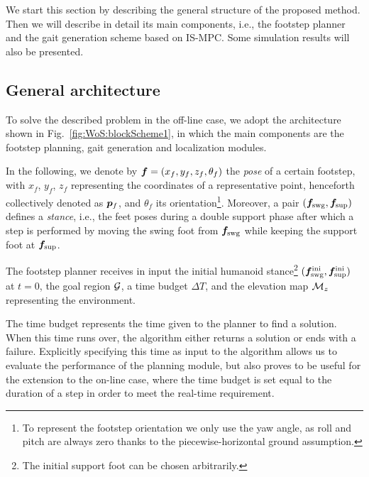 We start this section by describing the general structure of the proposed method. Then we will describe in detail its main components, i.e., the footstep planner and the gait generation scheme based on IS-MPC. Some simulation results will also be presented.   

\subsection{General architecture}
\label{sec:WoS:offlineCase:GeneralArchitecture}

To solve the described problem in the off-line case, we adopt the architecture shown in Fig.~\ref{fig:WoS:blockScheme1}, in which the main components are the footstep planning, gait generation and localization modules.

In the following, we denote by ${\bm{f}} = (x_{f}, y_{f}, z_{f}, \theta_{f})$ the {\em pose} of a certain footstep, with $x_{f}$, $y_{f}$, $z_{f}$ representing the coordinates of a representative point, henceforth collectively denoted as ${\bm{p}}_f$, and $\theta_{f}$ its orientation\footnote{To represent the footstep orientation we only use the yaw angle, as roll and pitch are always zero thanks to the piecewise-horizontal ground assumption.}.
Moreover, a pair $({\bm{f}}_{\rm swg}, {\bm{f}}_{\rm sup})$ defines a {\em stance}, i.e., the feet poses during a double support phase after which a step is performed by moving the swing foot from ${\bm{f}}_{\rm swg}$ while keeping the support foot at ${\bm{f}}_{\rm sup}$. 

The footstep planner receives in input the initial humanoid stance\footnote{The initial support foot can be chosen arbitrarily.} $({\bm{f}}_{\rm swg}^{\rm ini}, {\bm{f}}_{\rm sup}^{\rm ini})$ at $t=0$, the goal region $\cal G$, a time budget $\Delta T$, and the elevation map ${\cal M}_z$ representing the environment.

The time budget represents the time given to the planner to find a solution. When this time runs over, the algorithm either returns a solution or ends with a failure. Explicitly specifying this time as input to the algorithm allows us to evaluate the performance of the planning module, but also proves to be useful for the extension to the on-line case, where the time budget is set equal to the duration of a step in order to meet the real-time requirement.

